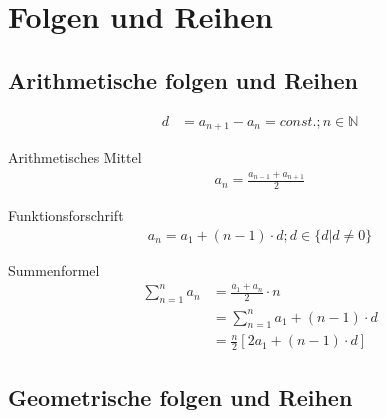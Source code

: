 \section{Folgen und Reihen}
\subsection{Arithmetische folgen und Reihen}

\begin{align*}
d &=a_{n+1} - a_n = const. ; n \in \mathbb{N}
\end{align*}

Arithmetisches Mittel
\begin{align*}
    a_n=\frac{a_{n-1}+a_{n+1}}{2}
\end{align*}

Funktionsforschrift
\begin{align*}
    a_n = a_1+(n-1) \cdot d ; d \in \{d|d \neq 0\}
\end{align*}

Summenformel
\begin{align*}
    \sum_{n=1}^{n} a_n &= \frac{a_1+a_n}{2} \cdot n \\
    &= \sum_{n=1}^{n} a_1 +(n-1) \cdot d \\
    &= \frac{n}{2}[2a_1+(n-1) \cdot d]
\end{align*}



\subsection{Geometrische folgen und Reihen}